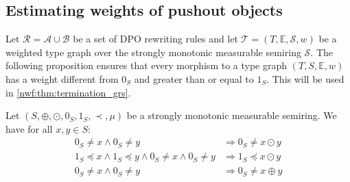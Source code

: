 








\subsection{Estimating weights of pushout objects}
Let \( \mathcal{R} = \mathcal{A} \cup \mathcal{B} \) be a set of DPO rewriting rules and let \(\mathcal{T} = (T, \mathbb{E}, \mathcal{S}, w)\) be a weighted type graph over the strongly monotonic measurable semiring $\mathcal{S}$.
The following proposition ensures that every morphism to a type graph $(T,S,\mathbb{E}, w)$ has a weight different from $0_S$ and greater than or equal to $1_S$.
This will be used in \autoref{nwf:thm:termination_grs}.
\begin{proposition}  
    \label{prop_endrullis_2d7}
    Let $(S, \oplus, \odot, 0_S, 1_S, \prec, \mu)$ be a strongly monotonic measurable semiring. We have for all $x,y\in S$:
    \begin{align*}
        0_S \neq x \land 0_S \neq y 
        &\Rightarrow 0_S \neq x \odot y 
        \tag{S10} \label{eq:prop_neq0_mul_neq0}  
        \\
        1_S \preceq x \land 1_S \preceq y \land 0_S \neq x \land 0_S \neq y  
        &\Rightarrow
         1_S \preceq x \odot y 
         \tag{S11} \label{eq:prop_neg0_ge1_mul_ge1}  
         \\
         0_S \neq x \land 0_S \neq y   
         &\Rightarrow 0_S \neq x \oplus y
         \tag{S12} \label{eq:prop_neq0_plus_neq0}  
    \end{align*}
\end{proposition}

